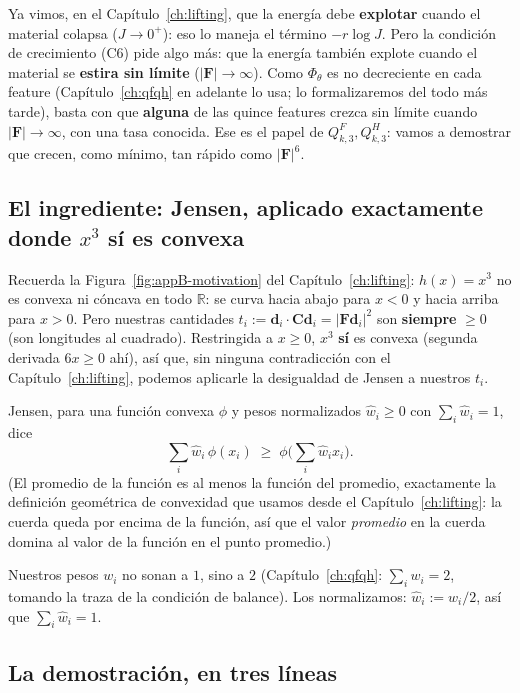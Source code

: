 \documentclass[11pt,a4paper]{article}
\newcommand{\R}{\mathbb{R}}
\begin{document}
Ya vimos, en el Cap\'itulo~\ref{ch:lifting}, que la energ\'ia debe
\textbf{explotar} cuando el material colapsa ($J\to0^+$): eso lo
maneja el t\'ermino $-r\log J$. Pero la condici\'on de crecimiento
(C6) pide algo m\'as: que la energ\'ia tambi\'en explote cuando el
material se \textbf{estira sin l\'imite} ($|\bm F|\to\infty$). Como
$\Phi_\theta$ es no decreciente en cada feature (Cap\'itulo~\ref{ch:qfqh}
en adelante lo usa; lo formalizaremos del todo m\'as tarde), basta con
que \textbf{alguna} de las quince features crezca sin l\'imite cuando
$|\bm F|\to\infty$, con una tasa conocida. Ese es el papel de
$Q_{k,3}^F,Q_{k,3}^H$: vamos a demostrar que crecen, como m\'inimo, tan
r\'apido como $|\bm F|^6$.

\subsection{El ingrediente: Jensen, aplicado exactamente donde $x^3$ s\'i es convexa}

Recuerda la Figura~\ref{fig:appB-motivation} del Cap\'itulo~\ref{ch:lifting}:
$h(x)=x^3$ no es convexa ni c\'oncava en todo $\R$: se curva hacia
abajo para $x<0$ y hacia arriba para $x>0$. Pero nuestras cantidades
$t_i:=\bm d_i\cdot\bm C\bm d_i=|\bm F\bm d_i|^2$ son \textbf{siempre}
$\geq0$ (son longitudes al cuadrado). Restringida a $x\geq0$, $x^3$
\textbf{s\'i} es convexa (segunda derivada $6x\geq0$ ah\'i), as\'i
que, sin ninguna contradicci\'on con el Cap\'itulo~\ref{ch:lifting},
podemos aplicarle la desigualdad de Jensen a nuestros $t_i$.

Jensen, para una funci\'on convexa $\phi$ y pesos normalizados
$\hat w_i\geq0$ con $\sum_i\hat w_i=1$, dice
\begin{equation}
 \sum_i\hat w_i\,\phi(x_i)\;\geq\;\phi\Big(\sum_i\hat w_i x_i\Big).
 \label{eq:appB-jensen}
\end{equation}
(El promedio de la funci\'on es al menos la funci\'on del promedio,
exactamente la definici\'on geom\'etrica de convexidad que usamos
desde el Cap\'itulo~\ref{ch:lifting}: la cuerda queda por encima de la
funci\'on, as\'i que el valor \emph{promedio} en la cuerda domina al
valor de la funci\'on en el punto promedio.)

Nuestros pesos $w_i$ no sonan a $1$, sino a $2$ (Cap\'itulo~\ref{ch:qfqh}:
$\sum_iw_i=2$, tomando la traza de la condici\'on de balance). Los
normalizamos: $\hat w_i:=w_i/2$, as\'i que $\sum_i\hat w_i=1$.

\subsection{La demostraci\'on, en tres l\'ineas}
\end{document}
